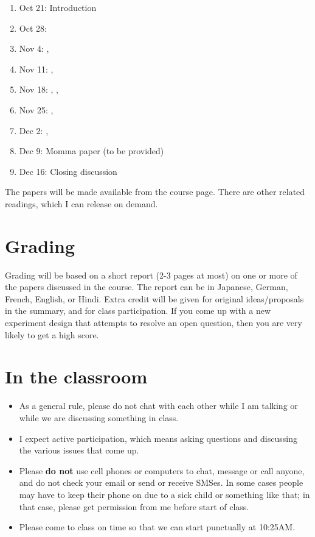 \documentclass[a4paper]{article}
\begin{document}
\begin{enumerate}
\item Oct 21: Introduction

\item Oct 28: \cite{engelmann2015determinants}

\item Nov 4: \cite{traxler2014trends}, \cite{LevyKeller2012} 

\item Nov 11: \cite{linzen2015uncertainty}, \cite{Jaegeretal2015}

\item Nov 18: \cite{VSLK08}, \cite{FrankEtAl2014}, \cite{bader2015interference}

\item Nov 25: \cite{omaki2015hyper}, \cite{mommatiming}


\item Dec 2: \cite{chow2013no}, \cite{chowbag}

\item Dec 9: Momma paper (to be provided)

\item Dec 16: Closing discussion

 
\end{enumerate}


The papers will be made available from the course page. There are other related readings, which I can release on demand.

\section{Grading}

Grading will be based on a short report (2-3 pages at most) on one or more of the papers discussed in the course.  The report can be in Japanese, German, French, English, or Hindi.  Extra credit will be given for original ideas/proposals in the summary, and for class participation. If you come up with a new experiment design that attempts to resolve an open question, then you are very likely to get a high score.

\section{In the classroom}

\begin{itemize}
\item As a general rule, please do not chat with each other while I am talking or while we are discussing something in class.
\item I expect active participation, which means asking questions and discussing the various issues that come up. 
\item  Please \textbf{do not} use cell phones or computers to chat, message or call anyone, and do not check your email or send or receive SMSes. In some cases people may have to keep their phone on due to a sick child or something like that; in that case, please get permission from me before start of class.
\item Please come to class on time so that we can start punctually at 10:25AM.
\end{itemize}



\end{document}
